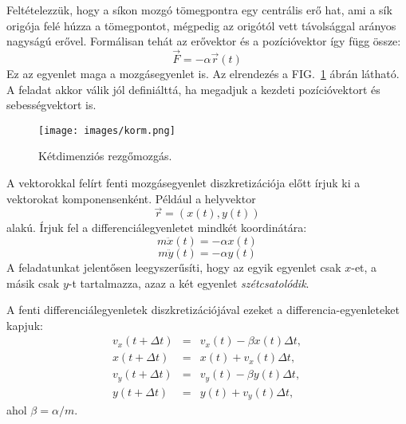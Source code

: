 \documentclass[%
 reprint,onecolumn,
 amsmath,amssymb,
 aps,
]{revtex4-2}
\begin{document}


Feltételezzük, hogy a síkon mozgó tömegpontra egy centrális
erő hat, ami a sík origója felé húzza a tömegpontot, 
mégpedig az origótól vett távolsággal arányos nagyságú
erővel. 
Formálisan tehát az erővektor és a pozícióvektor így függ össze:
\begin{equation}
    \vec{F} = - \alpha \vec{r}(t)
\end{equation}
Ez az egyenlet maga a mozgásegyenlet is.  
Az elrendezés a FIG.~\ref{fig:rezgomozgas} ábrán látható.
A feladat akkor válik jól definiálttá, ha megadjuk a kezdeti 
pozícióvektort és sebességvektort is. 

\begin{figure}[h]
    \centering
    \texttt{[image: images/korm.png]}
    \caption{Kétdimenziós rezgőmozgás.
    \label{fig:rezgomozgas}}
\end{figure}


A vektorokkal felírt fenti mozgásegyenlet diszkretizációja előtt 
írjuk ki a vektorokat komponensenként. 
Például a helyvektor 
\begin{equation}
    \vec{r} = (x(t), y(t))
\end{equation}
alakú.
Írjuk fel a differenciálegyenletet mindkét koordinátára:
\begin{equation}
    m \ddot{x}(t) = - \alpha x(t)
\end{equation}
\begin{equation}
    m \ddot{y}(t) = - \alpha y(t)    
\end{equation}
A feladatunkat jelentősen leegyszerűsíti, hogy az egyik egyenlet
csak $x$-et, a másik csak $y$-t tartalmazza,
azaz a két egyenlet \emph{szétcsatolódik}.


A fenti differenciálegyenletek diszkretizációjával 
ezeket a differencia-egyenleteket kapjuk:
\begin{eqnarray}
    v_{x}(t + \Delta t) &=& v_x(t) - \beta  x(t) \Delta t, \\
    x(t + \Delta t) &=&  x(t) + v_{x}(t) \Delta t, \\ 
    v_{y}(t + \Delta t) &=& v_y(t) - \beta  y(t) \Delta t, \\
    y(t + \Delta t) &=& y(t) + v_{y}(t) \Delta t, 
\end{eqnarray}
ahol $\beta = \alpha / m$.
\end{document}
